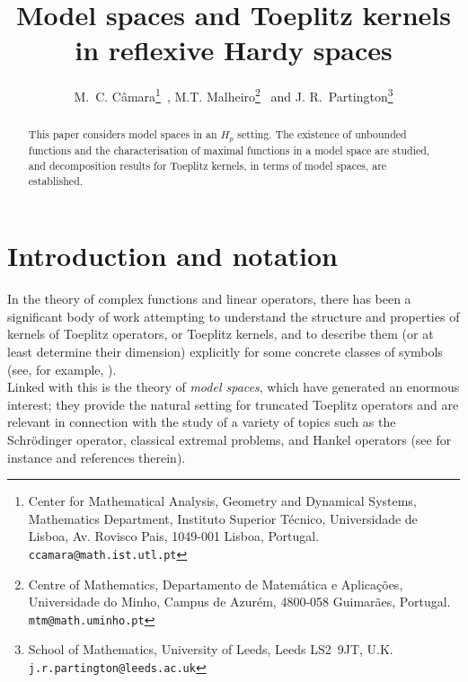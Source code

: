 \documentclass[11pt]{article}
\numberwithin{equation}{section}
\begin{document}
\title{Model spaces and Toeplitz kernels in reflexive Hardy spaces}
\author{M.~C. C\^amara\thanks{
Center for Mathematical Analysis, Geometry and Dynamical Systems,
Mathematics Department,
Instituto Superior T\'ecnico, Universidade de Lisboa,
Av. Rovisco Pais, 1049-001 Lisboa, Portugal.
 \tt ccamara@math.ist.utl.pt}~, 
M.T. Malheiro\thanks{
Centre of Mathematics, Departamento de Matem\'atica e Aplica\c{c}\~oes, Universidade do Minho, Campus de Azur\'em, 4800-058 Guimar\~aes, Portugal. \tt mtm@math.uminho.pt}
~and J. R.~Partington\thanks{School of Mathematics, University of Leeds, Leeds LS2~9JT, U.K. \tt j.r.partington@leeds.ac.uk}
}

\maketitle


\begin{abstract}
This paper considers model spaces  in an $H_p$ setting. 
The existence of unbounded functions and the characterisation of maximal functions in a model space are studied, and decomposition results for Toeplitz kernels, in terms of model spaces, are established.
\end{abstract}


\section{Introduction and notation}

In the theory of complex functions and linear operators, there has been a significant body of
work attempting to understand the structure and properties of kernels of Toeplitz
operators, or Toeplitz kernels, and to describe them (or at least determine their dimension) explicitly for some concrete classes of symbols (see, for example, \cite{BCD,CP14,Dyakonov,hayashi86,sarason88,sarason}).\\

Linked with this is the theory of {\em model spaces\/}, which have generated an enormous interest; they provide the natural setting for truncated Toeplitz operators and are relevant in connection with the study of a variety of topics such as the Schr\"odinger operator, classical extremal problems, and Hankel operators 
(see for instance \cite{Garcia and Ross} and references therein).\\
\end{document}
